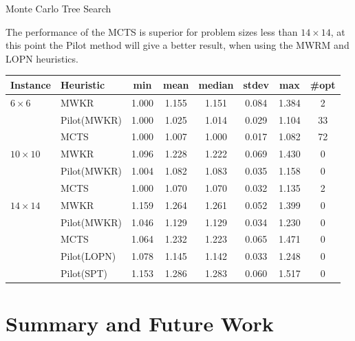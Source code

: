\documentclass[
	mode=present,
	paper=screen,
	orient=landscape,
	display=slides,
	style=simple
	]{powerdot}
\begin{document}
\begin{slide}{Monte Carlo Tree Search}

The performance of the MCTS is superior for problem sizes less than $14 \times 14$, at this point the Pilot method 
will give a better result, when using the MWRM and LOPN heuristics.

{\footnotesize
 \begin{center}
\begin{tabular}{l|l|ccccc|c}
Instance & Heuristic & min & mean & median & stdev & max & \#opt\\\hline
$ 6\times  6$ & MWKR & 1.000 & 1.155 & 1.151 & 0.084 & 1.384 & 2 \\
& Pilot(MWKR) & 1.000 & 1.025 & 1.014 & 0.029 & 1.104 & 33 \\
& MCTS & 1.000 & 1.007 & 1.000 & 0.017 & 1.082 & 72\\\hline
$10\times 10$ & MWKR & 1.096 & 1.228 & 1.222 & 0.069 & 1.430 & 0 \\
& Pilot(MWKR) & 1.004 & 1.082 & 1.083 & 0.035 & 1.158 & 0\\
& MCTS & 1.000 & 1.070 & 1.070 & 0.032 & 1.135 & 2\\\hline
$14\times 14$ & MWKR & 1.159 & 1.264 & 1.261 & 0.052 & 1.399 & 0 \\
& Pilot(MWKR) & 1.046 & 1.129 & 1.129 & 0.034 & 1.230 & 0\\
& MCTS & 1.064 & 1.232 & 1.223 & 0.065 & 1.471 & 0 \\\hline \pause
& Pilot(LOPN) & 1.078 & 1.145 & 1.142 & 0.033 & 1.248 & 0 \\
& Pilot(SPT) & 1.153 & 1.286 & 1.283 & 0.060 & 1.517 & 0\\\hline
\end{tabular}
 \end{center}}


\end{slide}



\section[slide=false]{Summary and Future Work}
\end{document}
